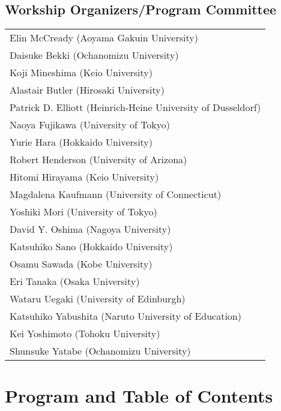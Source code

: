 \documentclass[12pt]{jarticle}
\begin{document}
\subsection*{Workship Organizers/Program Committee}
\begin{flushleft}
\begin{tabular}{l}
Elin McCready (Aoyama Gakuin University) \\
Daisuke Bekki (Ochanomizu University) \\
Koji Mineshima (Keio University) \\
Alastair Butler (Hirosaki University) \\
Patrick D. Elliott (Heinrich-Heine University of Dusseldorf) \\
Naoya Fujikawa (University of Tokyo) \\
Yurie Hara (Hokkaido University) \\
Robert Henderson (University of Arizona) \\
Hitomi Hirayama (Keio University) \\
Magdalena Kaufmann (University of Connecticut) \\
Yoshiki Mori (University of Tokyo) \\
David Y. Oshima (Nagoya University) \\
Katsuhiko Sano (Hokkaido University) \\
Osamu Sawada (Kobe University) \\
Eri Tanaka (Osaka University) \\
Wataru Uegaki (University of Edinburgh) \\
Katsuhiko Yabushita (Naruto University of Education) \\
Kei Yoshimoto (Tohoku University) \\
Shunsuke Yatabe (Ochanomizu University) \\

\end{tabular}
\end{flushleft}
\newpage
  
\section*{Program and Table of Contents}

\newcommand{\slot}[2]{\noindent \underline{#1 \  #2} \\}
\newcommand{\talk}[3]{
  \noindent #2 \\ 
  \indent\indent \textit{#1} \dotfill #3 
  \smallskip \\
  }
\newcommand{\talkk}[3]{
  \noindent #2 \\ 
  \indent\indent \textit{#1}
  \smallskip \\
  }
\end{document}
